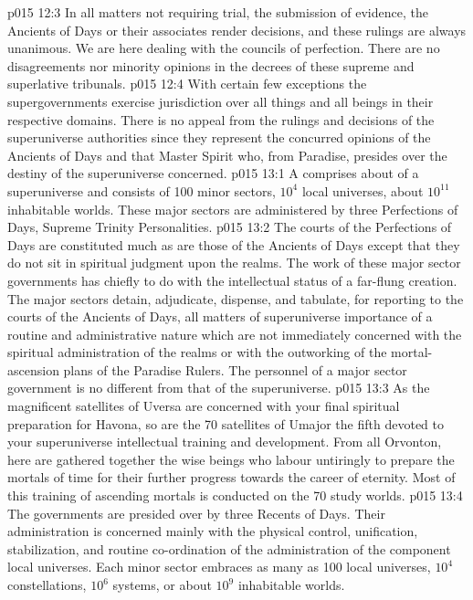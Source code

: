 \vs p015 12:3 In all matters not requiring trial, the submission of evidence, the Ancients of Days or their associates render decisions, and these rulings are always unanimous. We are here dealing with the councils of perfection. There are no disagreements nor minority opinions in the decrees of these supreme and superlative tribunals.
\vs p015 12:4 With certain few exceptions the supergovernments exercise jurisdiction over all things and all beings in their respective domains. There is no appeal from the rulings and decisions of the superuniverse authorities since they represent the concurred opinions of the Ancients of Days and that Master Spirit who, from Paradise, presides over the destiny of the superuniverse concerned.
\vs p015 13:1 A  comprises about  of a superuniverse and consists of 100 minor sectors, $10^4$ local universes, about $10^{11}$ inhabitable worlds. These major sectors are administered by three Perfections of Days, Supreme Trinity Personalities.
\vs p015 13:2 The courts of the Perfections of Days are constituted much as are those of the Ancients of Days except that they do not sit in spiritual judgment upon the realms. The work of these major sector governments has chiefly to do with the intellectual status of a far\hyp{}flung creation. The major sectors detain, adjudicate, dispense, and tabulate, for reporting to the courts of the Ancients of Days, all matters of superuniverse importance of a routine and administrative nature which are not immediately concerned with the spiritual administration of the realms or with the outworking of the mortal\hyp{}ascension plans of the Paradise Rulers. The personnel of a major sector government is no different from that of the superuniverse.
\vs p015 13:3 As the magnificent satellites of Uversa are concerned with your final spiritual preparation for Havona, so are the 70 satellites of Umajor the fifth devoted to your superuniverse intellectual training and development. From all Orvonton, here are gathered together the wise beings who labour untiringly to prepare the mortals of time for their further progress towards the career of eternity. Most of this training of ascending mortals is conducted on the 70 study worlds.
\vs p015 13:4 \pc The  governments are presided over by three Recents of Days. Their administration is concerned mainly with the physical control, unification, stabilization, and routine co\hyp{}ordination of the administration of the component local universes. Each minor sector embraces as many as 100 local universes, $10^4$ constellations, $10^6$ systems, or about $10^9$ inhabitable worlds.
